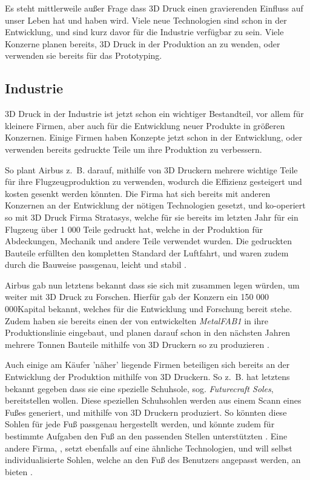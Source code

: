 Es steht mittlerweile außer Frage dass 3D Druck einen gravierenden Einfluss auf unser Leben hat und haben wird. Viele neue Technologien sind schon in der Entwicklung, und sind kurz davor für die Industrie verfügbar zu sein. Viele Konzerne planen bereits, 3D Druck in der Produktion an zu wenden, oder verwenden sie bereits für das Prototyping.


\subsection{Industrie}

3D Druck in der Industrie ist jetzt schon ein wichtiger Bestandteil, vor allem für kleinere Firmen, aber auch für die Entwicklung neuer Produkte in größeren Konzernen. Einige Firmen haben Konzepte jetzt schon in der Entwicklung, oder verwenden bereits gedruckte Teile um ihre Produktion zu verbessern.

So plant Airbus z.~B. darauf, mithilfe von 3D Druckern mehrere wichtige Teile für ihre Flugzeugproduktion zu verwenden, wodurch die Effizienz gesteigert und kosten gesenkt werden könnten. Die Firma hat sich bereits mit anderen Konzernen an der Entwicklung der nötigen Technologien gesetzt, und ko-operiert so mit 3D Druck Firma Stratasys, welche für sie bereits im letzten Jahr für ein Flugzeug über 1 000 Teile gedruckt hat, welche in der Produktion für Abdeckungen, Mechanik und andere Teile verwendet wurden. Die gedruckten Bauteile erfüllten den kompletten Standard der Luftfahrt, und waren zudem durch die Bauweise passgenau, leicht und stabil \parencite{1000_PART_PLANE}.

Airbus gab nun letztens bekannt dass sie sich mit  zusammen legen würden, um weiter mit 3D Druck zu Forschen. Hierfür gab der Konzern ein 150 000 000\EURO Kapital bekannt, welches für die Entwicklung und Forschung bereit stehe. Zudem haben sie bereits einen der von  entwickelten \emph{MetalFAB1} in ihre Produktionslinie eingebaut, und planen darauf schon in den nächsten Jahren mehrere Tonnen Bauteile mithilfe von 3D Druckern so zu produzieren \parencite{AIRBUS_METALFAB}.

\vspace{7pt}

Auch einige am Käufer 'näher' liegende Firmen beteiligen sich bereits an der Entwicklung der Produktion mithilfe von 3D Druckern.
So z.~B. hat  letztens bekannt gegeben dass sie eine spezielle Schuhsole, sog. \emph{Futurecraft Soles}, bereitstellen wollen. Diese speziellen Schuhsohlen werden aus einem Scann eines Fußes generiert, und mithilfe von 3D Druckern produziert. So könnten diese Sohlen für jede Fuß passgenau hergestellt werden, und könnte zudem für bestimmte Aufgaben den Fuß an den passenden Stellen unterstützten \parencite{ADIDAS}. Eine andere Firma, , setzt ebenfalls auf eine ähnliche Technologien, und will selbst individualisierte Sohlen, welche an den Fuß des Benutzers angepasst werden, an bieten \parencite{NEW_BALANCE}.

